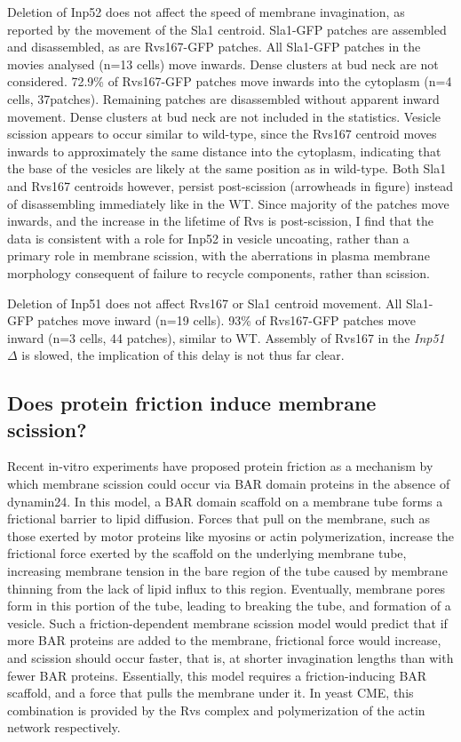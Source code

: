 	\vspace{5mm}
	Deletion of Inp52 does not affect the speed of membrane invagination, as reported by the movement of the Sla1 centroid. Sla1-GFP patches are assembled and disassembled, as are Rvs167-GFP patches. All Sla1-GFP patches in the movies analysed (n=13 cells) move inwards.  Dense clusters at bud neck are not considered. 72.9\% of Rvs167-GFP patches move inwards into the cytoplasm (n=4 cells, 37patches). Remaining patches are disassembled without apparent inward movement. Dense clusters at bud neck are not included in the statistics. Vesicle scission appears to occur similar to wild-type, since the Rvs167 centroid moves inwards to approximately the same distance into the cytoplasm, indicating that the base of the vesicles are likely at the same position as in wild-type. Both Sla1 and Rvs167 centroids however, persist post-scission (arrowheads in figure) instead of disassembling immediately like in the WT. Since majority of the patches move inwards, and the increase in the lifetime of Rvs is post-scission, I find that the data is consistent with a role for Inp52 in vesicle uncoating, rather than a primary role in membrane scission, with the aberrations in plasma membrane morphology consequent of failure to recycle components, rather than scission. 
	


	\vspace{5mm}
	Deletion of Inp51 does not affect Rvs167 or Sla1 centroid movement. All Sla1-GFP patches move inward (n=19 cells). 93\% of Rvs167-GFP patches move inward (n=3 cells, 44 patches), similar to WT. Assembly of Rvs167 in the \textit{Inp51$\Delta$ }is slowed, the implication of this delay is not thus far clear. 


	
	\subsection{Does protein friction induce membrane scission? }
	
	Recent in-vitro experiments have proposed protein friction as a mechanism by which membrane scission could occur via BAR domain proteins in the absence of dynamin24. In this model, a BAR domain scaffold on a membrane tube forms a frictional barrier to lipid diffusion. Forces that pull on the membrane, such as those exerted by motor proteins like myosins or actin polymerization, increase the frictional force exerted by the scaffold on the underlying membrane tube, increasing membrane tension in the bare region of the tube caused by membrane thinning from the lack of lipid influx to this region. Eventually, membrane pores form in this portion of the tube, leading to breaking the tube, and formation of a vesicle. Such a friction-dependent membrane scission model would predict that if more BAR proteins are added to the membrane, frictional force would increase, and scission should occur faster, that is, at shorter invagination lengths than with fewer BAR proteins. Essentially, this model requires a friction-inducing BAR scaffold, and a force that pulls the membrane under it. In yeast CME, this combination is provided by the Rvs complex and polymerization of the actin network respectively. 
	

